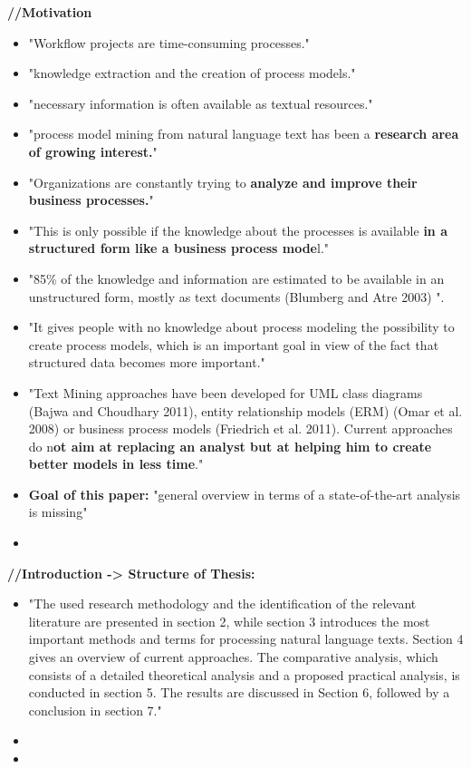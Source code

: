 \textbf{//Motivation}
\begin{itemize}
\item "Workflow projects are time-consuming processes."
\item "knowledge extraction and the creation of process models."
\item "necessary information is often available as textual resources."
\item "process model mining from natural language text has been a \textbf{research area of growing interest.}"
\item "Organizations are constantly trying to \textbf{analyze and improve their business processes.}"
\item "This is only possible if the knowledge about the processes is available \textbf{in a structured form like a business process mode}l."
\item "85\% of the knowledge and information are estimated to be available in an unstructured form, mostly as text documents (Blumberg and Atre 2003) \cite{blumberg2003problem}".
\item "It gives {people with no knowledge about process modeling the possibility to create process models,} which is an important goal in view of the fact that structured data becomes more important."
\item "Text Mining approaches have been developed for UML class diagrams (Bajwa and Choudhary 2011), entity relationship models (ERM) (Omar et al. 2008) or business process models (Friedrich et al. 2011). Current approaches do n\textbf{ot aim at replacing an analyst but at helping him to create better models in less time}."
\item \textbf{Goal of this paper:} "general overview in terms of a state-of-the-art analysis is missing"
\item 
\end{itemize}

\textbf{//Introduction -> Structure of Thesis:}
\begin{itemize}
\item "The used research methodology and the identification of the relevant literature are presented in section 2, while section 3 introduces the most important methods and terms for processing natural language texts. Section 4 gives an overview of current approaches. The comparative analysis, which consists of a detailed theoretical analysis and a proposed practical analysis, is conducted in section 5. The results are discussed in Section 6, followed by a conclusion in section 7."
\item 
\item 
\end{itemize}

